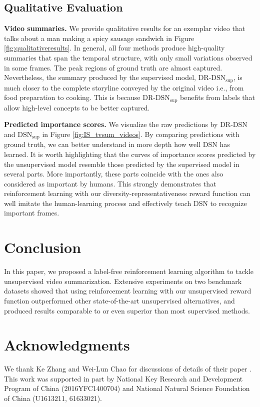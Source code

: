 \documentclass[letterpaper]{article} \usepackage{aaai18}  \usepackage{times}  \usepackage{helvet}  \usepackage{courier}  \usepackage{url}  \usepackage{graphicx}
\begin{document}
\subsection{Qualitative Evaluation}
{\bf Video summaries.} We provide qualitative results for an exemplar video that talks about a man making a spicy sausage sandwich in Figure \ref{fig:qualitativeresults}. In general, all four methods produce high-quality summaries that span the temporal structure, with only small variations observed in some frames. The peak regions of ground truth are almost captured. Nevertheless, the summary produced by the supervised model, $\text{DR-DSN}_\text{sup}$, is much closer to the complete storyline conveyed by the original video i.e., from food preparation to cooking. This is because $\text{DR-DSN}_\text{sup}$ benefits from labels that allow high-level concepts to be better captured.

{\bf Predicted importance scores.} We visualize the raw predictions by DR-DSN and $\text{DSN}_\text{sup}$ in Figure \ref{fig:IS_tvsum_videos}. By comparing predictions with ground truth, we can better understand in more depth how well DSN has learned. It is worth highlighting that the curves of importance scores predicted by the unsupervised model resemble those predicted by the supervised model in several parts. More importantly, these parts coincide with the ones also considered as important by humans. This strongly demonstrates that reinforcement learning with our diversity-representativeness reward function can well imitate the human-learning process and effectively teach DSN to recognize important frames.

\section{Conclusion}
In this paper, we proposed a label-free reinforcement learning algorithm to tackle unsupervised video summarization. Extensive experiments on two benchmark datasets showed that using reinforcement learning with our unsupervised reward function outperformed other state-of-the-art unsupervised alternatives, and produced results comparable to or even superior than most supervised methods.

\section{Acknowledgments}
We thank Ke Zhang and Wei-Lun Chao for discussions of details of their paper \cite{zhang2016video}. This work was supported in part by National Key Research and Development Program of China (2016YFC1400704) and 
National Natural Science Foundation of China (U1613211, 61633021).




\end{document}
